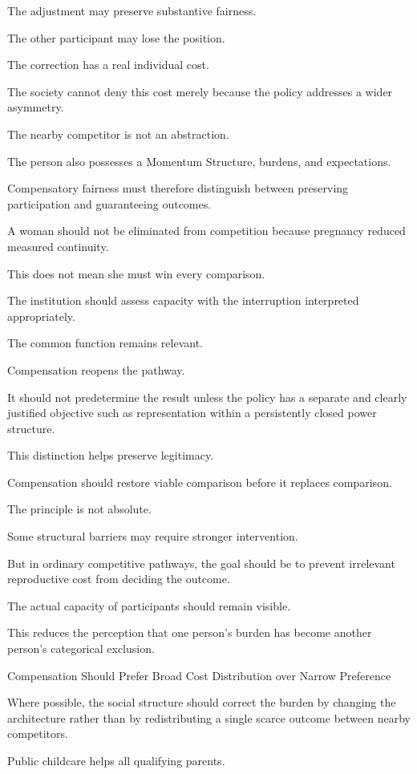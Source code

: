 The adjustment may preserve substantive fairness.

The other participant may lose the position.

The correction has a real individual cost.

The society cannot deny this cost merely because the policy addresses a wider asymmetry.

The nearby competitor is not an abstraction.

The person also possesses a Momentum Structure, burdens, and expectations.

Compensatory fairness must therefore distinguish between preserving participation and guaranteeing outcomes.

A woman should not be eliminated from competition because pregnancy reduced measured continuity.

This does not mean she must win every comparison.

The institution should assess capacity with the interruption interpreted appropriately.

The common function remains relevant.

Compensation reopens the pathway.

It should not predetermine the result unless the policy has a separate and clearly justified objective such as representation within a persistently closed power structure.

This distinction helps preserve legitimacy.

Compensation should restore viable comparison before it replaces comparison.

The principle is not absolute.

Some structural barriers may require stronger intervention.

But in ordinary competitive pathways, the goal should be to prevent irrelevant reproductive cost from deciding the outcome.

The actual capacity of participants should remain visible.

This reduces the perception that one person’s burden has become another person’s categorical exclusion.

Compensation Should Prefer Broad Cost Distribution over Narrow Preference

Where possible, the social structure should correct the burden by changing the architecture rather than by redistributing a single scarce outcome between nearby competitors.

Public childcare helps all qualifying parents.

